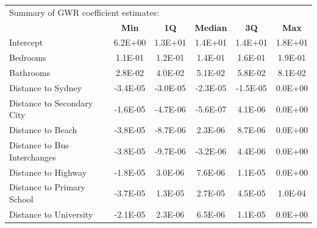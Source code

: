 \begin{table}[!ht]
  \centering \small
    \begin{tabular}{lccccc}
    \multicolumn{6}{l}{Summary of GWR coefficient estimates:} \\
          & \multicolumn{1}{c}{\textbf{Min}} & \multicolumn{1}{c}{\textbf{1Q}} & \multicolumn{1}{c}{\textbf{Median}} & \multicolumn{1}{c}{\textbf{3Q}} & \multicolumn{1}{c}{\textbf{Max}} \\
    \midrule
    Intercept & \multicolumn{1}{c}{6.2E+00} & \multicolumn{1}{c}{1.3E+01} & \multicolumn{1}{c}{1.4E+01} & \multicolumn{1}{c}{1.4E+01} & \multicolumn{1}{c}{1.8E+01} \\
    Bedrooms & \multicolumn{1}{c}{1.1E-01} & \multicolumn{1}{c}{1.2E-01} & \multicolumn{1}{c}{1.4E-01} & \multicolumn{1}{c}{1.6E-01} & \multicolumn{1}{c}{1.9E-01} \\
    Bathrooms & \multicolumn{1}{c}{2.8E-02} & \multicolumn{1}{c}{4.0E-02} & \multicolumn{1}{c}{5.1E-02} & \multicolumn{1}{c}{5.8E-02} & \multicolumn{1}{c}{8.1E-02} \\
    Distance to Sydney & \multicolumn{1}{c}{-3.4E-05} & \multicolumn{1}{c}{-3.0E-05} & \multicolumn{1}{c}{-2.3E-05} & \multicolumn{1}{c}{-1.5E-05} & \multicolumn{1}{c}{0.0E+00} \\
    Distance to Secondary City & \multicolumn{1}{c}{-1.6E-05} & \multicolumn{1}{c}{-4.7E-06} & \multicolumn{1}{c}{-5.6E-07} & \multicolumn{1}{c}{4.1E-06} & \multicolumn{1}{c}{0.0E+00} \\
    Distance to Beach & \multicolumn{1}{c}{-3.8E-05} & \multicolumn{1}{c}{-8.7E-06} & \multicolumn{1}{c}{2.3E-06} & \multicolumn{1}{c}{8.7E-06} & \multicolumn{1}{c}{0.0E+00} \\
    Distance to Bus Interchanges & \multicolumn{1}{c}{-3.8E-05} & \multicolumn{1}{c}{-9.7E-06} & \multicolumn{1}{c}{-3.2E-06} & \multicolumn{1}{c}{4.4E-06} & \multicolumn{1}{c}{0.0E+00} \\
    Distance to Highway & \multicolumn{1}{c}{-1.8E-05} & \multicolumn{1}{c}{3.0E-06} & \multicolumn{1}{c}{7.6E-06} & \multicolumn{1}{c}{1.1E-05} & \multicolumn{1}{c}{0.0E+00} \\
    Distance to Primary School & \multicolumn{1}{c}{-3.7E-05} & \multicolumn{1}{c}{1.3E-05} & \multicolumn{1}{c}{2.7E-05} & \multicolumn{1}{c}{4.5E-05} & \multicolumn{1}{c}{1.0E-04} \\
    Distance to University & \multicolumn{1}{c}{-2.1E-05} & \multicolumn{1}{c}{2.3E-06} & \multicolumn{1}{c}{6.5E-06} & \multicolumn{1}{c}{1.1E-05} & \multicolumn{1}{c}{0.0E+00} \\

\end{tabular}
\end{table}
